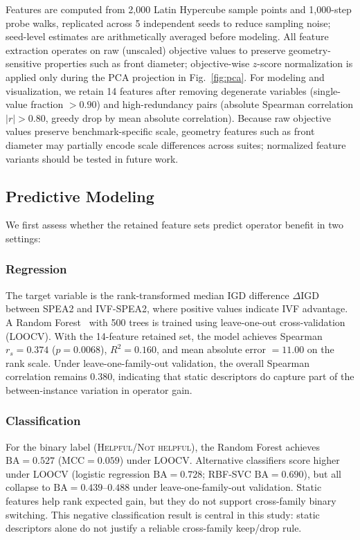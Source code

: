 \documentclass[conference]{IEEEtran}
\begin{document}
Features are computed from 2{,}000 Latin Hypercube sample points and
1{,}000-step probe walks, replicated across 5 independent seeds to reduce
sampling noise; seed-level estimates are arithmetically averaged before
modeling. All feature extraction operates on raw (unscaled) objective
values to preserve geometry-sensitive properties such as front diameter;
objective-wise $z$-score normalization is applied only during the PCA
projection in Fig.~\ref{fig:pca}. For modeling and visualization, we retain 14 features after
removing degenerate variables (single-value fraction $>0.90$) and
high-redundancy pairs (absolute Spearman correlation $|r| > 0.80$,
greedy drop by mean absolute correlation).
Because raw objective values preserve benchmark-specific scale, geometry
features such as front diameter may partially encode scale differences
across suites; normalized feature variants should be tested in future work.

\subsection{Predictive Modeling}
\label{sec:fla_prediction}

We first assess whether the retained feature sets predict operator
benefit in two settings:

\subsubsection{Regression}
The target variable is the rank-transformed median IGD difference
$\Delta\mathrm{IGD}$ between SPEA2 and IVF-SPEA2, where positive values
indicate IVF advantage.
A Random Forest~\cite{breiman2001random} with 500 trees is trained using leave-one-out
cross-validation (LOOCV). With the 14-feature retained set, the model
achieves Spearman $r_s = 0.374$ ($p = 0.0068$), $R^{2} = 0.160$, and
mean absolute error $= 11.00$ on the rank scale. Under
leave-one-family-out validation, the overall Spearman correlation remains
$0.380$, indicating that static descriptors do capture part of the
between-instance variation in operator gain.

\subsubsection{Classification}
For the binary label (\textsc{Helpful}/\textsc{Not helpful}), the Random
Forest achieves $\mathrm{BA} = 0.527$ ($\mathrm{MCC} = 0.059$) under LOOCV.
Alternative classifiers score higher under LOOCV (logistic regression
$\mathrm{BA} = 0.728$; RBF-SVC $\mathrm{BA} = 0.690$), but all collapse
to $\mathrm{BA} = 0.439$--$0.488$ under leave-one-family-out validation.
Static features help rank expected gain, but they do not support cross-family
binary switching. This negative classification result is central in this
study: static descriptors alone do not justify a reliable cross-family
keep/drop rule.
\end{document}
